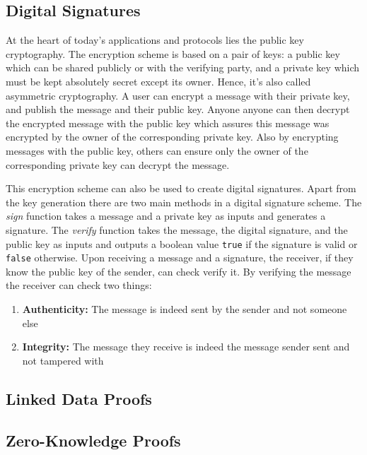 \subsection{Digital Signatures}

At the heart of today's applications and protocols lies the public key cryptography. The encryption scheme is based on a pair of keys: a public key which can be shared publicly or with the verifying party, and a private key which must be kept absolutely secret except its owner. Hence, it's also called asymmetric cryptography. A user can encrypt a message with their private key, and publish the message and their public key. Anyone anyone can then decrypt the encrypted message with the public key which assures this message was encrypted by the owner of the corresponding private key. Also by encrypting messages with the public key, others can ensure only the owner of the corresponding private key can decrypt the message.

This encryption scheme can also be used to create digital signatures. Apart from the key generation there are two main methods in a digital signature scheme. The \textit{sign} function takes a message and a private key as inputs and generates a signature. The \textit{verify} function takes the message, the digital signature, and the public key as inputs and outputs a boolean value \lstinline{true} if the signature is valid or \lstinline{false} otherwise. Upon receiving a message and a signature, the receiver, if they know the public key of the sender, can check verify it. By verifying the message the receiver can check two things:
\begin{enumerate}
    \item \textbf{Authenticity:} The message is indeed sent by the sender and not someone else
    \item \textbf{Integrity:} The message they receive is indeed the message sender sent and not tampered with
\end{enumerate}


\subsection{Linked Data Proofs}
\subsection{Zero-Knowledge Proofs}

